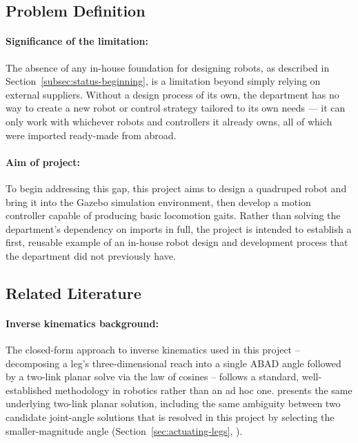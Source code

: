 \documentclass[12pt]{article}
\begin{document}
\subsection{Problem Definition}
\label{subsec:problem-definition}
\paragraph{Significance of the limitation:} The absence of any in-house foundation for designing robots, as described in Section~\ref{subsec:status-beginning}, is a limitation beyond simply relying on external suppliers. Without a design process of its own, the department has no way to create a new robot or control strategy tailored to its own needs — it can only work with whichever robots and controllers it already owns, all of which were imported ready-made from abroad.
\paragraph{Aim of project:} To begin addressing this gap, this project aims to design a quadruped robot and bring it into the Gazebo simulation environment, then develop a motion controller capable of producing basic locomotion gaits. Rather than solving the department's dependency on imports in full, the project is intended to establish a first, reusable example of an in-house robot design and development process that the department did not previously have.


\subsection{Related Literature}
\label{subsec:related-literature}

\paragraph{Inverse kinematics background:} The closed-form approach to inverse kinematics used in this project -- decomposing a leg's three-dimensional reach into a single ABAD angle followed by a two-link planar solve via the law of cosines -- follows a standard, well-established methodology in robotics rather than an ad hoc one. \citet{craig2017robotics} presents the same underlying two-link planar solution, including the same ambiguity between two candidate joint-angle solutions that is resolved in this project by selecting the smaller-magnitude angle (Section~\ref{sec:actuating-legs}, ).
\end{document}
